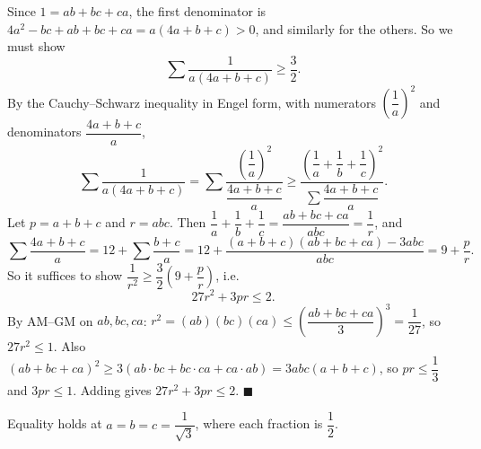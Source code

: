 Since $1=ab+bc+ca$, the first denominator is $4a^2-bc+ab+bc+ca=a(4a+b+c)>0$, and similarly for the others. So we must show
\[
\sum\dfrac{1}{a(4a+b+c)}\ge\dfrac{3}{2} .
\]
By the Cauchy--Schwarz inequality in Engel form, with numerators $\left(\dfrac{1}{a}\right)^2$ and denominators $\dfrac{4a+b+c}{a}$,
\[
\sum\dfrac{1}{a(4a+b+c)}=\sum\dfrac{\left(\dfrac{1}{a}\right)^2}{\dfrac{4a+b+c}{a}}\ge\dfrac{\left(\dfrac{1}{a}+\dfrac{1}{b}+\dfrac{1}{c}\right)^2}{\sum\dfrac{4a+b+c}{a}} .
\]
Let $p=a+b+c$ and $r=abc$. Then $\dfrac{1}{a}+\dfrac{1}{b}+\dfrac{1}{c}=\dfrac{ab+bc+ca}{abc}=\dfrac{1}{r}$, and
\[
\sum\dfrac{4a+b+c}{a}=12+\sum\dfrac{b+c}{a}=12+\dfrac{(a+b+c)(ab+bc+ca)-3abc}{abc}=9+\dfrac {p}{r} .
\]
So it suffices to show $\dfrac{1}{r^2}\ge\dfrac{3}{2}\left(9+\dfrac {p}{r}\right)$, i.e.\
\[
27r^2+3pr\le2 .
\]
By AM--GM on $ab,bc,ca$: $r^2=(ab)(bc)(ca)\le\left(\dfrac{ab+bc+ca}{3}\right)^3=\dfrac{1}{27}$, so $27r^2\le1$. Also $(ab+bc+ca)^2\ge3(ab\cdot bc+bc\cdot ca+ca\cdot ab)=3abc(a+b+c)$, so $pr\le\dfrac{1}{3}$ and $3pr\le1$. Adding gives $27r^2+3pr\le2$. $\blacksquare$

Equality holds at $a=b=c=\dfrac{1}{\sqrt3}$, where each fraction is $\dfrac{1}{2}$.

